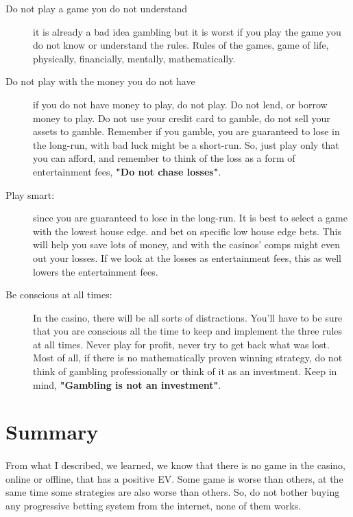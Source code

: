 \documentclass{article}
\begin{document}
\begin{description}
\item[Do not play a game you do not understand] it is already a bad idea gambling but it is worst if you play the game you do not know or understand the rules.  Rules of the games, game of life, physically, financially, mentally, mathematically.
\item[Do not play with the money you do not have] if you do not have money to play, do not play.  Do not lend, or borrow money to play.  Do not use your credit card to gamble, do not sell your assets to gamble.  Remember if you gamble, you are guaranteed to lose in the long-run, with bad luck might be a short-run.  So, just play only that you can afford, and remember to think of the loss as a form of entertainment fees, \textbf{"Do not chase losses"}.
\item[Play smart:] since you are guaranteed to lose in the long-run.  It is best to select a game with the lowest house edge.  and bet on specific low house edge bets.  This will help you save lots of money, and with the casinos' comps might even out your losses.  If we look at the losses as entertainment fees, this as well lowers the entertainment fees. 
\item[Be conscious at all times:] In the casino, there will be all sorts of distractions.  You'll have to be sure that you are conscious all the time to keep and implement the three rules at all times.  Never play for profit, never try to get back what was lost.  Most of all, if there is no mathematically proven winning strategy, do not think of gambling professionally or think of it as an investment.  Keep in mind, \textbf{"Gambling is not an investment"}.
\end{description}















\clearpage
\section{Summary}
\paragraph{ }From what I described, we learned, we know that there is no game in the casino, online or offline, that has a positive EV.  Some game is worse than others, at the same time some strategies are also worse than others.  So, do not bother buying any progressive betting system from the internet, none of them works. \\
\end{document}
